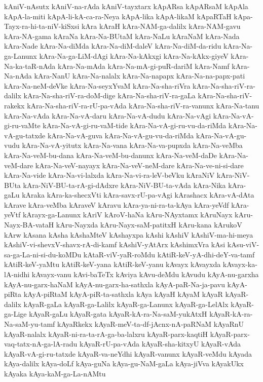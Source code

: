 {kAniV-nAsutx
kAniV-na-rAda
kAniV-tayxtarx
kApARsa
kApARsaM
kApAla
kApA-la-miti
kApA-li-kA-ca-ra-Neya
kApA-lika
kApA-likaM
kApaRTaH
kApa-Tayx-ra-hi-ta-niV-kiSxsi
kAra
kAraH
kAra-NAM-ga-dalilx
kAra-NAM-gavu
kAra-NA-gama
kAraNa
kAra-Na-BUtaM
kAra-NaLu
kAraNaM
kAra-Nada
kAra-Nade
kAra-Na-diMda
kAra-Na-diM-daleV
kAra-Na-diM-da-ridu
kAra-Na-ga-Lanunx
kAra-Na-ga-LiM-dAgi
kAra-Na-kAkxgi
kAra-Na-kAkx-giyeV
kAra-Na-ka-taR-nAda
kAra-Na-mAda
kAra-Na-mA-gi-puR-dariM
kAra-Namf
kAra-Na-nAda
kAra-NanU
kAra-Na-nalalx
kAra-Na-napapx
kAra-Na-na-papx-pati
kAra-Na-neM-deVke
kAra-Na-seyxYvaM
kAra-Na-sha-riVra
kAra-Na-sha-riV-ra-dalilx
kAra-Na-sha-riV-ra-doM-dige
kAra-Na-sha-riV-ra-gaLa
kAra-Na-sha-riV-rakekx
kAra-Na-sha-riV-ra-rU-pa-vAda
kAra-Na-sha-riV-ra-vanunx
kAra-Na-tanu
kAra-Na-vAda
kAra-Na-vA-daru
kAra-Na-vA-dudu
kAra-Na-vAgi
kAra-Na-vA-gi-ru-vaMte
kAra-Na-vA-gi-ru-vaM-tide
kAra-Na-vA-gi-ru-vu-da-riMda
kAra-Na-vA-gu-tatxde
kAra-Na-vA-guva
kAra-Na-vA-gu-vu-da-riMda
kAra-Na-vA-gu-vudu
kAra-Na-vA-yitutx
kAra-Na-vana
kAra-Na-va-pupxda
kAra-Na-veMba
kAra-Na-veM-bu-dana
kAra-Na-veM-bu-danunx
kAra-Na-veM-daDe
kAra-Na-veM-dare
kAra-Na-veV-nayayx
kAra-Na-veV-neM-dare
kAra-Na-ve-ni-si-dare
kAra-Na-vide
kAra-Na-vi-lalxda
kAra-Na-vi-ra-leV-beVku
kAraNiV
kAra-NiV-BUta
kAra-NiV-BU-ta-rA-gi-dAdxre
kAra-NiV-BU-ta-vAda
kAra-Nika
kAra-gaLu
kAraka
kAra-ka-shecxVti
kAra-savx-rU-pa-vAgi
kArashacx
kAra-vA-dAta
kArave
kAra-veMba
kAraveV
kAravu
kAra-ya-ni-ra-ta-kAya
kAra-yeVdf
kAra-yeVtf
kArayx-ga-Lanunx
kAriV
kAroV-haNa
kAru-NAyxtamx
kAruNayx
kAru-Nayx-BA-vataH
kAru-Nayxda
kAru-Nayx-saM-patitxH
kAru-kana
kArukoV
kArw
kAsana
kAsha
kAshaMteV
kAshayxpa
kAshi
kAshiV
kAshiV-ma-hi-meya
kAshiV-vi-shevxV-shavx-rA-di-kamf
kAshiV-yAtArx
kAshimxVra
kAsi
kAsu-viV-sa-ga-La-ni-si-du-koMDu
kAtaR-viV-yaR-roMdu
kAtiR-keV-yA-dhi-deY-va-tamf
kAtiR-keV-yaMtu
kAtiR-keV-yana
kAtiR-keV-yanu
kAvayx
kAvayxda
kAvayx-ka-lA-nidhi
kAvayx-vanu
kAvi-baTeTx
kAviya
kAvu-deMdu
kAvudu
kAyA-nu-garxha
kAyA-nu-garx-haNaM
kAyA-nu-garx-ha-sathxla
kAyA-paR-Na-ja-pavu
kAyA-piRta
kAyA-piRtaM
kAyA-piR-ta-sathxla
kAya
kAyaH
kAyaM
kAyaR
kAyaR-dalilx
kAyaR-gaLa
kAyaR-ga-Lalilx
kAyaR-ga-Lanunx
kAyaR-ga-LelAlx
kAyaR-ga-Lige
kAyaR-gaLu
kAyaR-gata
kAyaR-kA-ra-Na-saM-yukAtxH
kAyaR-kA-ra-Na-saM-yu-tamf
kAyaRkekx
kAyaR-meV-ta-df-jAcnx-nA-paRNaM
kAyaRnU
kAyaR-nalalx
kAyaR-ni-ra-ta-rA-ga-ba-lalxru
kAyaR-parx-kaqtiH
kAyaR-parx-vaq-tatx-nA-ga-lA-radu
kAyaR-rU-pa-vAda
kAyaR-sha-kitxyU
kAyaR-vAda
kAyaR-vA-gi-ru-tatxde
kAyaR-va-neYdhi
kAyaR-vanunx
kAyaR-veMdu
kAyada
kAya-dalilx
kAya-doLf
kAya-guNa
kAya-gu-NaM-gaLa
kAya-jiVva
kAyakUkx
kAyaka
kAya-kaM-ga-La-nAMtu
}
